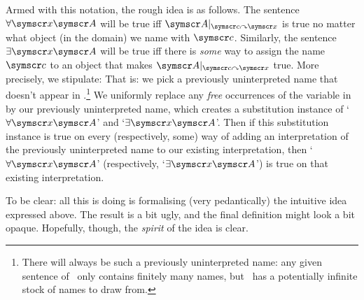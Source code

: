 \begin{earg}
Armed with this notation, the rough idea is as follows. The sentence $\forall \meta{x}\meta{A}$ will be true iff $\meta{A}\subs{\meta{c}}{\meta{x}}$ is true no matter what object (in the domain) we name with $\meta{c}$. Similarly, the sentence $\exists \meta{x}\meta{A}$ will be true iff there is \emph{some} way to assign the name $\meta{c}$ to an object that makes $\meta{A}\subs{\meta{c}}{\meta{x}}$ true. More precisely, we stipulate:\label{quant.tcs.precise}
That is: we pick a previously uninterpreted name that doesn't appear in .\footnote{There will always be such a previously uninterpreted name: any given sentence of \FOL\ only contains finitely many names, but \FOL\ has a potentially infinite stock of names to draw from.} We uniformly replace any \emph{free} occurrences of the variable  in  by our previously uninterpreted name, which creates a substitution instance of `$\forall \meta{x}\meta{A}$' and `$\exists \meta{x}\meta{A}$'. Then if this substitution instance is true on every (respectively, some) way of adding an interpretation of the previously uninterpreted name to our existing interpretation, then `$\forall \meta{x}\meta{A}$' (respectively, `$\exists \meta{x}\meta{A}$') is true on that existing interpretation. 

To be clear: all this is doing is formalising (very pedantically) the intuitive idea expressed above. The result is a bit ugly, and the final definition might look a bit opaque. Hopefully, though, the \emph{spirit} of the idea is clear. 


\end{earg}
